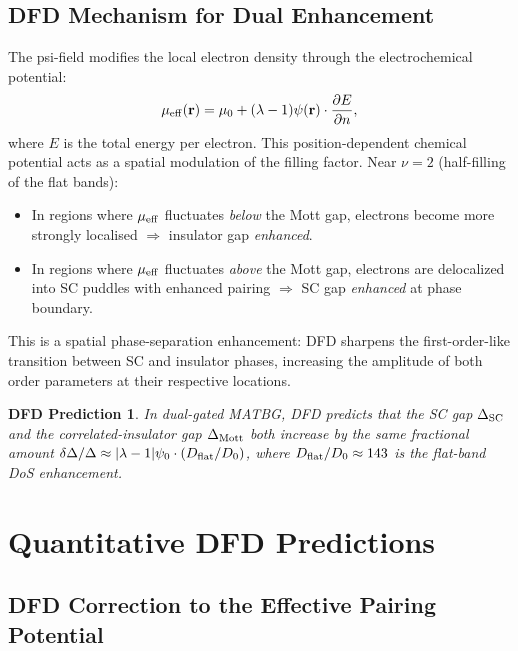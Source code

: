 \documentclass[11pt]{article}
\newtheorem{prediction}{DFD Prediction}
\newcommand{\psifield}{\psi}
\newcommand{\nuFill}{\nu}
\newcommand{\Vmott}{\Delta_{\rm Mott}}
\begin{document}
\subsection{DFD Mechanism for Dual Enhancement}

The psi-field modifies the local electron density through the electrochemical
potential:
\begin{equation}
  \mu_{\rm eff}(\mathbf{r}) = \mu_0 + (\lambda-1)\psifield(\mathbf{r})
    \cdot \frac{\partial E}{\partial n},
  \label{eq:mu_eff}
\end{equation}
where $E$ is the total energy per electron. This position-dependent
chemical potential acts as a spatial modulation of the filling factor.
Near $\nuFill = 2$ (half-filling of the flat bands):
\begin{itemize}
  \item In regions where $\mu_{\rm eff}$ fluctuates \emph{below} the
    Mott gap, electrons become more strongly localised $\Rightarrow$
    insulator gap \emph{enhanced}.
  \item In regions where $\mu_{\rm eff}$ fluctuates \emph{above} the
    Mott gap, electrons are delocalized into SC puddles with enhanced
    pairing $\Rightarrow$ SC gap \emph{enhanced} at phase boundary.
\end{itemize}
This is a spatial phase-separation enhancement: DFD sharpens the
first-order-like transition between SC and insulator phases, increasing
the amplitude of both order parameters at their respective locations.

\begin{prediction}
  \label{pred:dual}
  In dual-gated MATBG, DFD predicts that the SC gap $\Delta_{\rm SC}$
  and the correlated-insulator gap $\Vmott$ both increase by the same
  fractional amount $\delta\Delta/\Delta \approx |\lambda-1|\psi_0 \cdot
  (D_{\rm flat}/D_0)$, where $D_{\rm flat}/D_0 \approx 143$ is the
  flat-band DoS enhancement.
\end{prediction}

\section{Quantitative DFD Predictions}
\label{sec:quantitative}

\subsection{DFD Correction to the Effective Pairing Potential}
\end{document}
